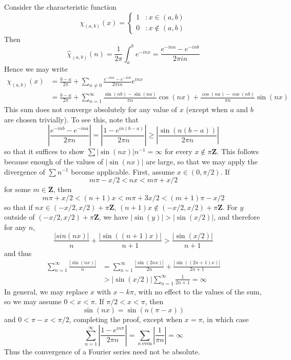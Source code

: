 \begin{example}
    Consider the characteristic function
    \[ \chi_{(a,b)}(x) = \begin{cases} 1 & : x \in (a,b) \\ 0 & : x \not \in (a,b) \end{cases} \]
    Then
    \[ \widehat{\chi}_{(a,b)}(n) = \frac{1}{2\pi} \int_a^b e^{-inx} = \frac{e^{-ina} - e^{-inb}}{2\pi i n} \]
    Hence we may write
    \begin{align*}
        \chi_{(a,b)}(x) &= \frac{b-a}{2\pi} + \sum_{n \neq 0} \frac{e^{-ina} - e^{-inb}}{2 \pi i n} e^{inx}\\
        &= \frac{b-a}{2\pi} + \sum_{n = 1}^\infty \frac{\sin(nb) - \sin(na)}{\pi n} \cos(nx) + \frac{\cos(na) - \cos(nb)}{\pi n} \sin(nx)
    \end{align*}
    This sum does not converge absolutely for any value of $x$ (except when $a$ and $b$ are chosen trivially). To see this, note that
    \[ \left|\frac{e^{-inb} - e^{-ina}}{2 \pi n}\right| = \left| \frac{1 - e^{in(b-a)}}{2 \pi n} \right| \geq \left| \frac{\sin(n(b-a))}{2 \pi n} \right| \]
    so that it suffices to show $\sum |\sin(nx)| n^{-1} = \infty$ for every $x \not \in \pi \mathbf{Z}$. This follows because enough of the values of $|\sin(nx)|$ are large, so that we may apply the divergence of $\sum n^{-1}$ become applicable. First, assume $x \in (0,\pi/2)$. If
    \[ m \pi - x/2 < nx < m \pi + x/2 \]
    for some $m \in \mathbf{Z}$, then
    \[ m \pi + x/2 < (n+1)x < m \pi + 3x/2 < (m+1) \pi - x/2 \]
    so that if $nx \in (-x/2,x/2) + \pi \mathbf{Z}$, $(n+1)x \not \in (-x/2,x/2) + \pi \mathbf{Z}$. For $y$ outside of $(-x/2,x/2) + \pi \mathbf{Z}$, we have $|\sin(y)| > |\sin(x/2)|$, and therefore for any $n$,
    \[ \frac{|sin(nx)|}{n} + \frac{|\sin((n+1)x)|}{n+1} > \frac{|\sin(x/2)|}{n+1} \]
    and thus
    \begin{align*}
        \sum_{n = 1}^\infty \frac{|\sin(nx)|}{n} &= \sum_{n = 1}^\infty \frac{|\sin(2nx)|}{2n} + \frac{|\sin((2n+1)x)|}{2n+1}\\
        &> |\sin(x/2)| \sum_{n = 1}^\infty \frac{1}{2n+1} = \infty
    \end{align*}
    In general, we may replace $x$ with $x - k \pi$, with no effect to the values of the sum, so we may assume $0 < x < \pi$. If $\pi/2 < x < \pi$, then
    \[ \sin(nx) = \sin(n(\pi - x)) \]
    and $0 < \pi - x < \pi/2$, completing the proof, except when $x = \pi$, in which case
    \[ \sum_{n = 1}^\infty \left| \frac{1 - e^{in \pi}}{2 \pi n} \right| = \sum_{n\ \text{even}} \left| \frac{1}{\pi n} \right| = \infty \]
    Thus the convergence of a Fourier series need not be absolute.
\end{example}

